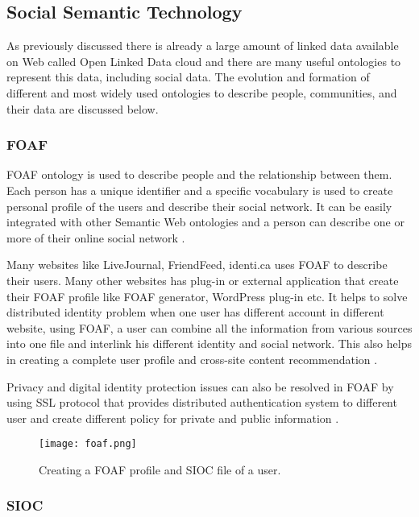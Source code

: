\subsection{Social Semantic Technology}

As previously discussed there is already a large amount of linked data available on Web called Open Linked Data cloud and there are many useful ontologies to represent this data, including social data. The evolution and formation of different and most widely used ontologies to describe people, communities, and their data are discussed below.

\subsubsection{FOAF}

FOAF ontology is used to describe people and the relationship between them. Each person has a unique identifier and a specific vocabulary is used to create personal profile of the users and describe their social network. It can be easily integrated with other Semantic Web ontologies and a person can describe one or more of their online social network \cite{brickley2010foaf}.

Many websites like LiveJournal, FriendFeed, identi.ca uses FOAF to describe their users. Many other websites has plug-in or external application that create their FOAF profile like FOAF generator, WordPress plug-in etc. It helps to solve distributed identity problem when one user has different account in different website, using FOAF, a user can combine all the information from various sources into one file and interlink his different identity and social network. This also helps in creating a complete user profile and cross-site content recommendation \cite{bojars2008interlinking}.

Privacy and digital identity protection issues can also be resolved in FOAF by using SSL protocol that provides distributed authentication system to different user and create different policy for private and public information \cite{bojars2008weaving}.

\begin{figure}[!htb]
  \centering
  \texttt{[image: foaf.png]}
  \caption{Creating a FOAF profile and SIOC file of a user.}
  \label{Figure:figex2b}
\end{figure}


\subsubsection{SIOC}

